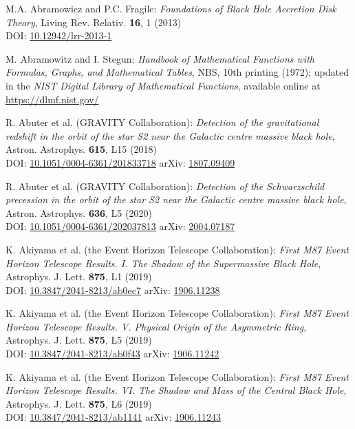 \begin{thebibliography}{123}

M.A. Abramowicz and P.C. Fragile:
{\em Foundations of Black Hole Accretion Disk Theory},
Living Rev. Relativ. {\bf 16}, 1 (2013)\\
DOI: \href{https://doi.org/10.12942/lrr-2013-1}{10.12942/lrr-2013-1}

M. Abramowitz and I. Stegun:
{\em Handbook of Mathematical Functions with Formulas, Graphs, and Mathematical Tables},
NBS, 10th printing (1972); updated in the
{\em NIST Digital Library of Mathematical Functions}, available online at \\
\url{https://dlmf.nist.gov/}

R. Abuter et al. (GRAVITY Collaboration):
{\em Detection of the gravitational redshift in the orbit of the star S2 near the Galactic centre massive black hole},
Astron. Astrophys. {\bf 615}, L15 (2018)\\
DOI: \href{https://doi.org/10.1051/0004-6361/201833718}{10.1051/0004-6361/201833718}\hfill
arXiv: \href{https://arxiv.org/abs/1807.09409}{1807.09409}

R. Abuter et al. (GRAVITY Collaboration):
{\em Detection of the Schwarzschild precession in the orbit of the star
S2 near the Galactic centre massive black hole},
Astron. Astrophys. {\bf 636}, L5 (2020)\\
DOI: \href{https://doi.org/10.1051/0004-6361/202037813}{10.1051/0004-6361/202037813}\hfill
arXiv: \href{https://arxiv.org/abs/2004.07187}{2004.07187}

K. Akiyama et al. (the Event Horizon Telescope Collaboration):
{\em First M87 Event Horizon Telescope Results. I. The Shadow of the Supermassive Black Hole},
Astrophys. J. Lett. {\bf 875}, L1 (2019)\\
DOI: \href{https://doi.org/10.3847/2041-8213/ab0ec7}{10.3847/2041-8213/ab0ec7}\hfill
arXiv: \href{https://arxiv.org/abs/1906.11238}{1906.11238}

K. Akiyama et al. (the Event Horizon Telescope Collaboration):
{\em First M87 Event Horizon Telescope Results. V. Physical Origin of the Asymmetric Ring},
Astrophys. J. Lett. {\bf 875}, L5 (2019)\\
DOI: \href{https://doi.org/10.3847/2041-8213/ab0f43}{10.3847/2041-8213/ab0f43}\hfill
arXiv: \href{https://arxiv.org/abs/1906.11242}{1906.11242}

K. Akiyama et al. (the Event Horizon Telescope Collaboration):
{\em First M87 Event Horizon Telescope Results. VI. The Shadow and Mass of the Central Black Hole},
Astrophys. J. Lett. {\bf 875}, L6 (2019)\\
DOI: \href{https://doi.org/10.3847/2041-8213/ab1141}{10.3847/2041-8213/ab1141}\hfill
arXiv: \href{https://arxiv.org/abs/1906.11243}{1906.11243}


\end{thebibliography}

